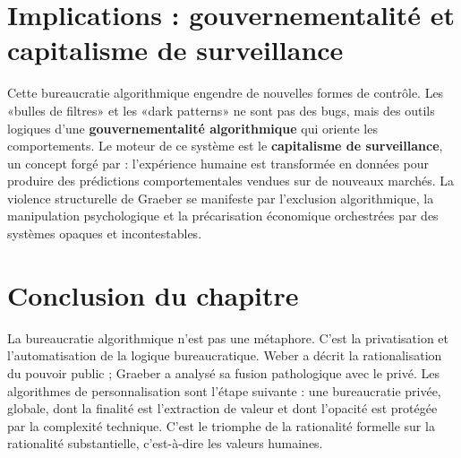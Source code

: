 \section{Implications : gouvernementalité et capitalisme de surveillance}
Cette bureaucratie algorithmique engendre de nouvelles formes de contrôle. Les «bulles de filtres» \citep{Pariser2011} et les «dark patterns» ne sont pas des bugs, mais des outils logiques d'une \textbf{gouvernementalité algorithmique} qui oriente les comportements. Le moteur de ce système est le \textbf{capitalisme de surveillance}, un concept forgé par \citet{Zuboff2019} : l'expérience humaine est transformée en données pour produire des prédictions comportementales vendues sur de nouveaux marchés. La violence structurelle de Graeber se manifeste par l'exclusion algorithmique, la manipulation psychologique et la précarisation économique orchestrées par des systèmes opaques et incontestables.

\section{Conclusion du chapitre}
La bureaucratie algorithmique n'est pas une métaphore. C'est la privatisation et l'automatisation de la logique bureaucratique. Weber a décrit la rationalisation du pouvoir public ; Graeber a analysé sa fusion pathologique avec le privé. Les algorithmes de personnalisation sont l'étape suivante : une bureaucratie privée, globale, dont la finalité est l'extraction de valeur et dont l'opacité est protégée par la complexité technique. C'est le triomphe de la rationalité formelle sur la rationalité substantielle, c'est-à-dire les valeurs humaines.
